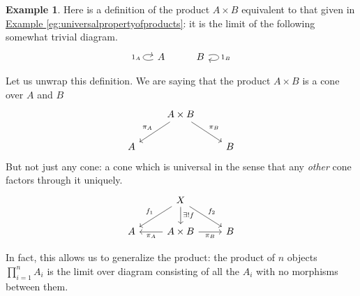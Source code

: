 \documentclass[a4paper]{report}
\theoremstyle{definition}
\newtheorem{example}{Example}[section]
\theoremstyle{plain}
\theoremstyle{remark}
\begin{document}
\begin{example}
  Here is a definition of the product $A \times B$ equivalent to that given in \hyperref[eg:universalpropertyofproducts]{Example \ref*{eg:universalpropertyofproducts}}: it is the limit of the following somewhat trivial diagram.
  \begin{equation*}
    \begin{tikzcd}
      A
      \arrow[loop left, "1_{A}"]
      & B
      \arrow[loop right, "1_{B}"]
    \end{tikzcd}
  \end{equation*}

  Let us unwrap this definition. We are saying that the product $A \times B$ is a cone over $A$ and $B$
  \begin{equation*}
    \begin{tikzcd}
      & A \times B
      \arrow[dl, swap, "\pi_{A}"]
      \arrow[dr, "\pi_{B}"]
      \\
      A & & B
    \end{tikzcd}
  \end{equation*}
  But not just any cone: a cone which is universal in the sense that any \emph{other} cone factors through it uniquely.
  \begin{equation*}
    \begin{tikzcd}
      & X
      \arrow[dl, swap, "f_{1}"]
      \arrow[dr, "f_{2}"]
      \arrow[d, "\exists!f"]
      \\
      A 
      & A \times B 
      \arrow[l, "\pi_{A}"]
      \arrow[r, swap, "\pi_{B}"]
      & B
    \end{tikzcd}
  \end{equation*}

  In fact, this allows us to generalize the product: the product of $n$ objects $\prod_{i=1}^{n} A_{i}$ is the limit over diagram consisting of all the $A_{i}$ with no morphisms between them.
\end{example}
\end{document}
